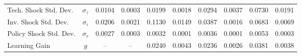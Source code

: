 \begin{sidewaystable}
\begin{scriptsize}
\begin{center}
\begin{tabular}{|l|c|cc|cc|cc|cc|}
Tech. Shock Std. Dev. & $\sigma_{z}$ & 0.0104 & 0.0003 & 0.0199 & 0.0018 & 0.0294 & 0.0037 & 0.0730 & 0.0191 \\  
Inv. Shock Std. Dev. & $\sigma_{\iota}$ & 0.0206 & 0.0021 & 0.1130 & 0.0149 & 0.0387 & 0.0016 & 0.0683 & 0.0069 \\  
Policy Shock Std. Dev. & $\sigma_{r}$ & 0.0027 & 0.0003 & 0.0032 & 0.0001 & 0.0036 & 0.0001 & 0.0053 & 0.0003 \\  
Learning Gain & $g$ & -- & -- & 0.0240 & 0.0043 & 0.0236 & 0.0026 & 0.0381 & 0.0038 \\ \hline 
\end{tabular}
\end{center}
\end{scriptsize}
\end{sidewaystable}

